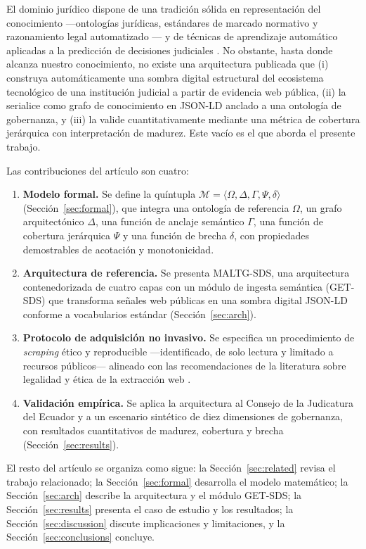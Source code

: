 \documentclass[computers,article,submit,pdftex,moreauthors]{Definitions/mdpi}
\begin{document}
El dominio jurídico dispone de una tradición sólida en representación del conocimiento —ontologías jurídicas, estándares de marcado normativo y razonamiento legal automatizado \cite{BenchCapon2012,Casanovas2016}— y de técnicas de aprendizaje automático aplicadas a la predicción de decisiones judiciales \cite{Katz2017,Medvedeva2020}. No obstante, hasta donde alcanza nuestro conocimiento, no existe una arquitectura publicada que (i) construya automáticamente una sombra digital estructural del ecosistema tecnológico de una institución judicial a partir de evidencia web pública, (ii) la serialice como grafo de conocimiento en JSON-LD anclado a una ontología de gobernanza, y (iii) la valide cuantitativamente mediante una métrica de cobertura jerárquica con interpretación de madurez. Este vacío es el que aborda el presente trabajo.

Las contribuciones del artículo son cuatro:
\begin{enumerate}
\item \textbf{Modelo formal.} Se define la quíntupla $\mathcal{M} = \langle \Omega, \Delta, \Gamma, \Psi, \delta \rangle$ (Sección~\ref{sec:formal}), que integra una ontología de referencia $\Omega$, un grafo arquitectónico $\Delta$, una función de anclaje semántico $\Gamma$, una función de cobertura jerárquica $\Psi$ y una función de brecha $\delta$, con propiedades demostrables de acotación y monotonicidad.
\item \textbf{Arquitectura de referencia.} Se presenta MALTG-SDS, una arquitectura contenedorizada de cuatro capas con un módulo de ingesta semántica (GET-SDS) que transforma señales web públicas en una sombra digital JSON-LD conforme a vocabularios estándar (Sección~\ref{sec:arch}).
\item \textbf{Protocolo de adquisición no invasivo.} Se especifica un procedimiento de \emph{scraping} ético y reproducible —identificado, de solo lectura y limitado a recursos públicos— alineado con las recomendaciones de la literatura sobre legalidad y ética de la extracción web \cite{Krotov2020}.
\item \textbf{Validación empírica.} Se aplica la arquitectura al Consejo de la Judicatura del Ecuador y a un escenario sintético de diez dimensiones de gobernanza, con resultados cuantitativos de madurez, cobertura y brecha (Sección~\ref{sec:results}).
\end{enumerate}

El resto del artículo se organiza como sigue: la Sección~\ref{sec:related} revisa el trabajo relacionado; la Sección~\ref{sec:formal} desarrolla el modelo matemático; la Sección~\ref{sec:arch} describe la arquitectura y el módulo GET-SDS; la Sección~\ref{sec:results} presenta el caso de estudio y los resultados; la Sección~\ref{sec:discussion} discute implicaciones y limitaciones, y la Sección~\ref{sec:conclusions} concluye.
\end{document}
